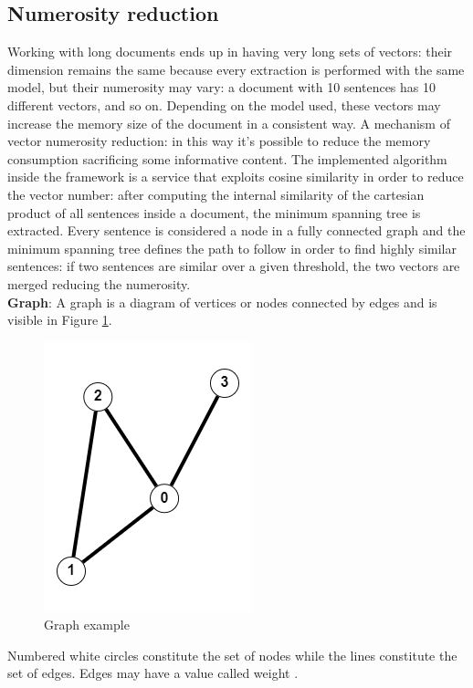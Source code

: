 \documentclass[\main/main.tex]{subfiles}
\begin{document}
\subsection{Numerosity reduction}
Working with long documents ends up in having very long sets of vectors: their dimension remains the same because every extraction is performed with the same model, but their numerosity may vary: a document with 10 sentences has 10 different vectors, and so on. Depending on the model used, these vectors may increase the memory size of the document in a consistent way. A mechanism of vector numerosity reduction: in this way it's possible to reduce the memory consumption sacrificing some informative content. The implemented algorithm inside the framework is a service that exploits cosine similarity in order to reduce the vector number: after computing the internal similarity of the cartesian product of all sentences inside a document, the minimum spanning tree is extracted. Every sentence is considered a node in a fully connected graph and the minimum spanning tree defines the path to follow in order to find highly similar sentences: if two sentences are similar over a given threshold, the two vectors are merged reducing the numerosity. \\
\textbf{Graph}:
A graph is a diagram of vertices or nodes connected by edges and is visible in Figure \ref{fig:graph_example}.
\begin{center}
    \begin{figure}[H]
    \centering
    \includegraphics[scale=1]{images/methods/graph_example.png}
    \caption{Graph example}
    \label{fig:graph_example}
\end{figure}
\end{center}
Numbered white circles constitute the set of nodes while the lines constitute the set of edges. Edges may have a value called weight \cite{Siu1998IntroductionTG}. \\
\end{document}
